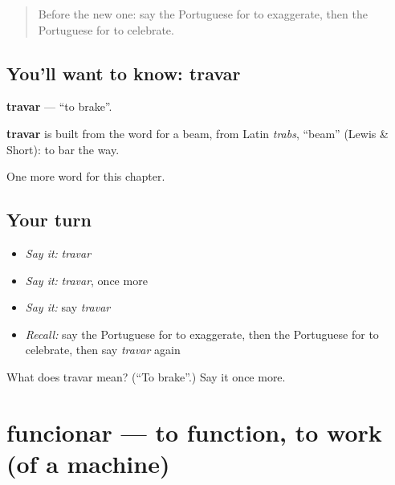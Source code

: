 \label{lesson:PT-C237-travar}



\begin{quote}
Before the new one: say the Portuguese for to exaggerate, then the Portuguese for to celebrate.
\end{quote}

\subsection*{You'll want to know: travar}
\textbf{travar} — \textquotedblleft{}to brake\textquotedblright{}.

\begin{cousinweb}
\textbf{travar} is built from the word for a beam, from Latin \emph{trabs}, \textquotedblleft{}beam\textquotedblright{} (Lewis \& Short): to bar the way.
\end{cousinweb}

\begin{grammarlens}[title={What you've built}]
One more word for this chapter.
\end{grammarlens}

\subsection*{Your turn}
\begin{itemize}
\raggedright
  \item \emph{Say it:} \emph{travar}
  \item \emph{Say it:} \emph{travar}, once more
  \item \emph{Say it:} say \emph{travar}
  \item \emph{Recall:} say the Portuguese for to exaggerate, then the Portuguese for to celebrate, then say \emph{travar} again
\end{itemize}

\begin{tcolorbox}[breakable,colback=teal!4,colframe=teal!35!black,title={Before you move on}]
What does travar mean? (\textquotedblleft{}To brake\textquotedblright{}.) Say it once more.
\end{tcolorbox}
\section[funcionar]{funcionar — to function, to work (of a machine)}

\label{lesson:PT-C237-funcionar}



